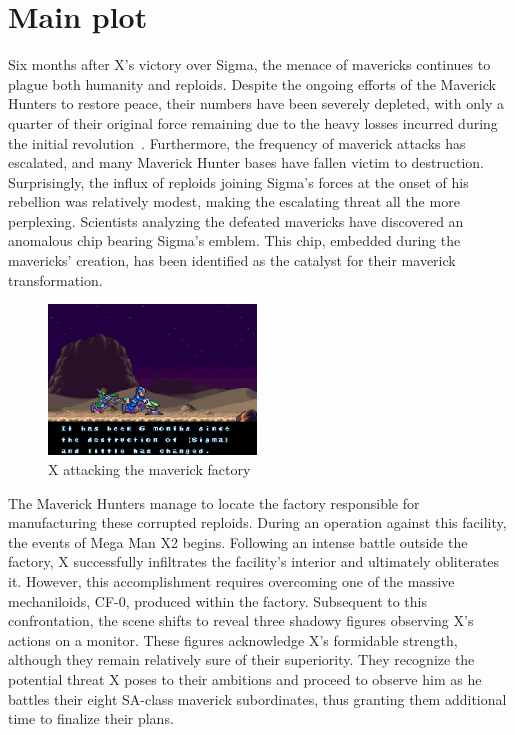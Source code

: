 \section{Main plot}
Six months after X's victory over Sigma, the menace of mavericks continues to plague both humanity and reploids. Despite the ongoing efforts of the Maverick Hunters to restore peace, their numbers have been severely depleted, with only a quarter of their original force remaining due to the heavy losses incurred during the initial revolution~\cite{Xcoll1:Manual_X2}. Furthermore, the frequency of maverick attacks has escalated, and many Maverick Hunter bases have fallen victim to destruction. Surprisingly, the influx of reploids joining Sigma's forces at the onset of his rebellion was relatively modest, making the escalating threat all the more perplexing. Scientists analyzing the defeated mavericks have discovered an anomalous chip bearing Sigma's emblem. This chip, embedded during the mavericks' creation, has been identified as the catalyst for their maverick transformation.
\begin{figure}[htp]
	\centering
	\includegraphics[height=4cm]{figures/X2/story_1.jpg}
	\caption {X attacking the maverick factory}
\end{figure}
 The Maverick Hunters manage to locate the factory responsible for manufacturing these corrupted reploids. During an operation against this facility, the events of Mega Man X2 begins. Following an intense battle outside the factory, X successfully infiltrates the facility's interior and ultimately obliterates it. However, this accomplishment requires overcoming one of the massive mechaniloids, CF-0, produced within the factory. Subsequent to this confrontation, the scene shifts to reveal three shadowy figures observing X's actions on a monitor. These figures acknowledge X's formidable strength, although they remain relatively sure of their superiority. They recognize the potential threat X poses to their ambitions and proceed to observe him as he battles their eight SA-class maverick subordinates, thus granting them additional time to finalize their plans.
 
